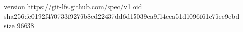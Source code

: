 version https://git-lfs.github.com/spec/v1
oid sha256:fe0192f470733f9276b8ed22437dd6d15039ea9f14eca51d1096f61c76ee9ebd
size 96638
